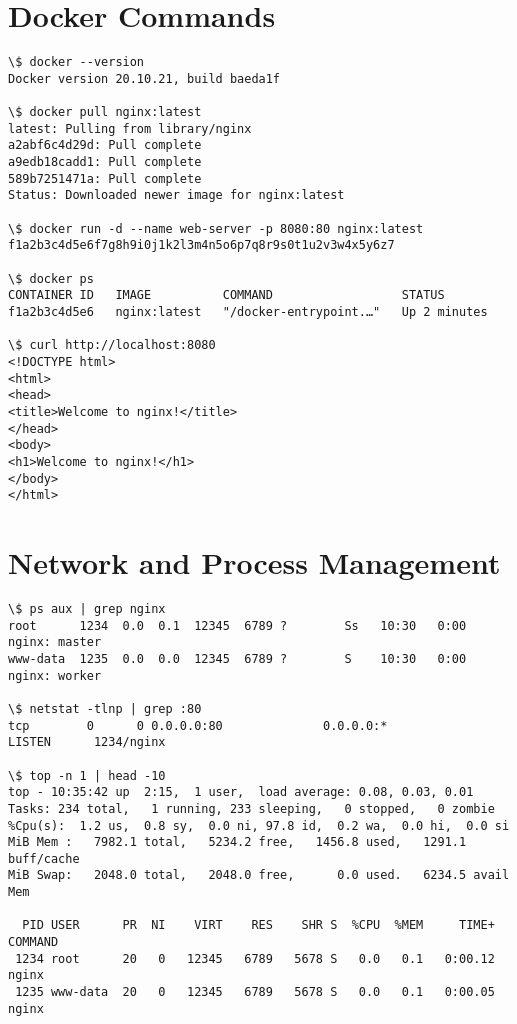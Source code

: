 \section{Docker Commands}

\begin{lstlisting}[style=terminal, caption=Docker Operations]
\$ docker --version
Docker version 20.10.21, build baeda1f

\$ docker pull nginx:latest
latest: Pulling from library/nginx
a2abf6c4d29d: Pull complete
a9edb18cadd1: Pull complete
589b7251471a: Pull complete
Status: Downloaded newer image for nginx:latest

\$ docker run -d --name web-server -p 8080:80 nginx:latest
f1a2b3c4d5e6f7g8h9i0j1k2l3m4n5o6p7q8r9s0t1u2v3w4x5y6z7

\$ docker ps
CONTAINER ID   IMAGE          COMMAND                  STATUS
f1a2b3c4d5e6   nginx:latest   "/docker-entrypoint.…"   Up 2 minutes

\$ curl http://localhost:8080
<!DOCTYPE html>
<html>
<head>
<title>Welcome to nginx!</title>
</head>
<body>
<h1>Welcome to nginx!</h1>
</body>
</html>
\end{lstlisting}

\section{Network and Process Management}

\begin{lstlisting}[style=terminal, caption=System Monitoring]
\$ ps aux | grep nginx
root      1234  0.0  0.1  12345  6789 ?        Ss   10:30   0:00 nginx: master
www-data  1235  0.0  0.0  12345  6789 ?        S    10:30   0:00 nginx: worker

\$ netstat -tlnp | grep :80
tcp        0      0 0.0.0.0:80              0.0.0.0:*               LISTEN      1234/nginx

\$ top -n 1 | head -10
top - 10:35:42 up  2:15,  1 user,  load average: 0.08, 0.03, 0.01
Tasks: 234 total,   1 running, 233 sleeping,   0 stopped,   0 zombie
%Cpu(s):  1.2 us,  0.8 sy,  0.0 ni, 97.8 id,  0.2 wa,  0.0 hi,  0.0 si
MiB Mem :   7982.1 total,   5234.2 free,   1456.8 used,   1291.1 buff/cache
MiB Swap:   2048.0 total,   2048.0 free,      0.0 used.   6234.5 avail Mem

  PID USER      PR  NI    VIRT    RES    SHR S  %CPU  %MEM     TIME+ COMMAND
 1234 root      20   0   12345   6789   5678 S   0.0   0.1   0:00.12 nginx
 1235 www-data  20   0   12345   6789   5678 S   0.0   0.1   0:00.05 nginx
\end{lstlisting}

